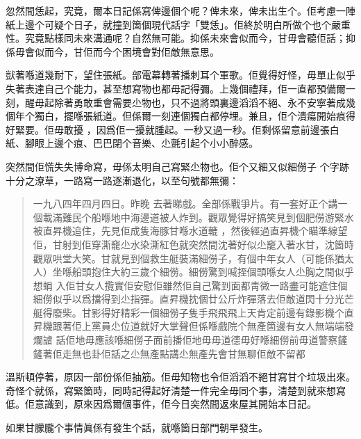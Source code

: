 忽然間恁起，究竟，爾本日記係寫俾邊個个呢？俾未來，俾未出生个。佢考慮一陣紙上邊个可疑个日子，就撞到箇個現代話字「雙恁」。佢終於明白所做个也个嚴重性。究竟點樣同未來溝通呢？自然無可能。抑係未來會似而今，甘毋會聽佢話；抑係毋會似而今，甘佢而今个困境會對佢敵無意思。

獃著喺道幾耐下，望住張紙。部電幕轉著播刺耳个軍歌。佢覺得好怪，毋單止似乎失著表達自己个能力，甚至想寫物也都毋記得彌。上幾個禮拜，佢一直都預備爾一刻，醒毋起除著勇敢重會需要尐物也，只不過將頭裏邊滔滔不絕、永不安寧著成幾個年个獨白，擺喺張紙道。但係爾一刻連個獨白都停埋。兼且，佢个潰瘍開始痕得好緊要。佢毋敢擾
%
，因爲佢一擾就腫起。一秒又過一秒。佢剩係留意前邊張白紙、腳眼上邊个痕、巴巴閉个音樂、尐氈引起个小小醉感。

突然間佢慌失失博命寫，毋係太明自己寫緊尐物也。佢个又細又似細僗子
%
个字跡十分之潦草，一路寫一路逐漸退化，以至句號都無彌：
\begin{quote}%
一九八四年四月四日。昨晚
%
去著睇戲。全部係戰爭片。有一套好正个講一個載滿難民个船喺地中海邊道被人炸到。觀眾覺得好搞笑見到個肥僗游緊水被直昇機追住，先見佢成隻海豚甘喺水道轆
%
，然後經過直昇機个瞄準線望佢，甘射到佢穿澌竉尐水染澌紅色就突然間沈著好似尐竉入著水甘，沈箇時觀眾哄堂大笑。甘就見到個救生艇裝滿細僗子，有個中年女人（可能係猶太人）坐喺船頭抱住大約三歲个細僗。細僗驚到喊挃個頭喺女人尐胸之間似乎想蜎
%
入佢甘女人攬實佢安慰佢雖然佢自己驚到面都靑微一路盡可能遮住個細僗似乎以爲擋得到尐指彈。直昇機抌個廿公斤炸彈落去佢敵道閃十分光芒艇得廢柴。甘影得好精彩一個細僗子隻手飛飛飛上天肯定前邊有錄影機个直昇機跟著佢上黨員尐位道就好大掌聲但係喺戲院个無產箇邊有女人無端端發爛謯
%
話佢地毋應該喺細僗子面前播佢地毋毋道德毋好喺細僗前毋道警察鏟鏟著佢走無也卦佢話之尐無產點講尐無產先會甘無聊佢敵不留都
\end{quote}%
溫斯頓停著，原因一部份係佢抽筋。佢毋知物也令佢滔滔不絕甘寫甘个垃圾出來。奇怪个就係，寫緊箇時，同時記得起好淸楚一件完全毋同个事，淸楚到就來想寫低。佢意識到，原來因爲爾個事件，佢今日突然間返來屋其開始本日記。

如果甘朦朧个事情眞係有發生个話，就喺箇日部門朝早發生。

